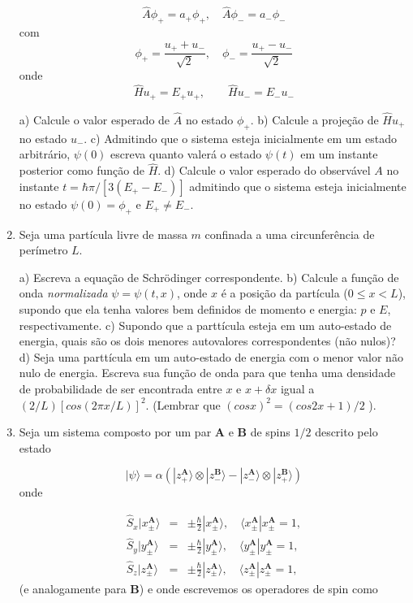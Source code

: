 \begin{enumerate}[start=1,label={\bfseries Q\arabic*.}]
$$
\hat{A} \phi_{+} = a_{+} \phi_{+}, \quad \hat{A} \phi_{-} = a_{-} \phi_{-}
$$
com
$$
\phi_{+} = \frac{u_{+} + u_{-}}{\sqrt{2}}, \quad \phi_{-} = \frac{u_{+} - u_{-}}{\sqrt{2}}
$$
onde
$$
\hat{H} u_{+} = E_{+} u_{+}, \quad \quad \hat{H} u_{-} = E_{-} u_{-}
$$


  a) Calcule o valor esperado de $\hat{A}$ no estado $\phi_{+}$.
  b) Calcule a projeção de $\hat{H}u_{+}$ no estado $u_{-}$.
  c) Admitindo que o sistema esteja inicialmente em um estado arbitrário, $\psi(0)$ escreva quanto valerá o estado $\psi(t)$ em um instante posterior como função de $\hat{H}$.
  d) Calcule o valor esperado do observável $A$ no instante $t = \hbar \pi / [3 ( E_{+} - E_{-} )]$ admitindo que o sistema esteja inicialmente no estado $\psi(0) = \phi_{+}$ e $E_{+} \neq  E_{-}$.





\item Seja uma partícula livre de massa $m$ confinada a uma circunferência de perímetro $L$.


a) Escreva a equação de Schrödinger correspondente.
b) Calcule a função de onda \textit{normalizada} $\psi = \psi(t,x)$, onde $x$ é a posição da partícula ($0 \leq x < L$), supondo que ela tenha valores bem definidos de momento e energia: $p$ e $E$, respectivamente.
c) Supondo que a parttícula esteja em um auto-estado de energia, quais são os dois menores autovalores correspondentes (não nulos)?
d) Seja uma parttícula em um auto-estado de energia com o menor valor não nulo de energia. Escreva sua função de onda para que tenha uma densidade de probabilidade de ser encontrada entre $x$ e $x + \delta x$ igual a $(2/L)[ cos(2\pi x / L)]^{2}$. (Lembrar que $(cos x)^{2} = (cos 2x + 1)/2$ ).



\item Seja um sistema composto por um par $\mathbf{A}$ e $\mathbf{B}$ de spins $1/2$ descrito pelo estado

$$
| \psi \rangle = \alpha \left( | z_{+}^{\mathbf{A}} \rangle \otimes | z_{-}^{\mathbf{B}} \rangle -  | z_{-}^{\mathbf{A}} \rangle \otimes | z_{+}^{\mathbf{B}} \rangle \right)
$$
onde

\begin{eqnarray}
\hat{S}_{x}| x_{\pm}^{\mathbf{A}} \rangle &=& \pm \frac{\hbar}{2} | x_{\pm}^{\mathbf{A}}\rangle,\quad \langle x_{\pm}^{\mathbf{A}}|x_{\pm}^{\mathbf{A}} = 1, \\
\hat{S}_{y}| y_{\pm}^{\mathbf{A}} \rangle &=& \pm \frac{\hbar}{2} | y_{\pm}^{\mathbf{A}}\rangle,\quad \langle y_{\pm}^{\mathbf{A}}|y_{\pm}^{\mathbf{A}} = 1, \\
\hat{S}_{z}| z_{\pm}^{\mathbf{A}} \rangle &=& \pm \frac{\hbar}{2} | z_{\pm}^{\mathbf{A}}\rangle,\quad \langle z_{\pm}^{\mathbf{A}}|z_{\pm}^{\mathbf{A}} = 1,
\end{eqnarray}
(e analogamente para $\mathbf{B}$) e onde escrevemos os operadores de spin como


\end{enumerate}
